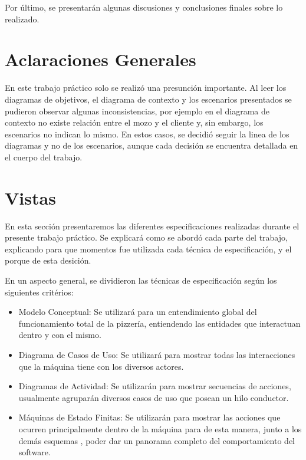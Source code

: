 \documentclass[a4paper,10pt]{article}
\begin{document}
Por \'ultimo, se presentar\'an algunas discusiones y conclusiones finales sobre lo realizado.


\section*{Aclaraciones Generales}

En este trabajo pr\'actico solo se realiz\'o una presunci\'on importante. Al leer los diagramas de objetivos, el diagrama de contexto y los escenarios presentados se pudieron observar algunas inconsistencias, por ejemplo en el diagrama de contexto no existe relaci\'on entre el mozo y el cliente y, sin embargo, los escenarios no indican lo mismo. En estos casos, se decidi\'o seguir la linea de los diagramas y no de los escenarios, aunque cada decisi\'on se encuentra detallada en el cuerpo del trabajo.



\newpage


\section*{Vistas}
En esta secci\'on presentaremos las diferentes especificaciones realizadas durante el presente trabajo pr\'actico.
Se explicar\'a como se abord\'o cada parte del trabajo, explicando para que momentos fue utilizada cada t\'ecnica de especificaci\'on, y el porque
de esta desici\'on.

En un aspecto general, se dividieron las t\'ecnicas de especificaci\'on seg\'un los siguientes crit\'erios:

\begin{itemize}
\item Modelo Conceptual: Se utilizar\'a para un entendimiento global del funcionamiento total de la pizzer\'ia, entiendendo las entidades que interactuan dentro y con el mismo.
\item Diagrama de Casos de Uso: Se utilizar\'a para mostrar todas las interacciones que la m\'aquina tiene con los diversos actores.
\item Diagramas de Actividad: Se utilizar\'an para mostrar secuencias de acciones, usualmente agrupar\'an diversos casos de uso que posean un hilo conductor.
\item M\'aquinas de Estado Finitas: Se utilizar\'an para mostrar las acciones que ocurren principalmente dentro de la m\'aquina para de esta manera, junto a los dem\'as esquemas
, poder dar un panorama completo del comportamiento del software.
\end{itemize}
\end{document}
